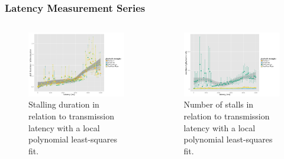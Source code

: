 \documentclass{beamer}
\begin{document}
\begin{frame}
	\frametitle{Latency Measurement Series}

	\begin{columns}[T]
		\begin{figure}
		\centering
		\includegraphics[width=1.0\columnwidth]{../../chapters/03-streaming/images/R-playbackemulation-stallduration-latency.pdf}
		\caption{Stalling duration in relation to transmission latency with a local polynomial least-squares fit.}
		\end{figure}

		\begin{figure}
		\centering
		\includegraphics[width=1.0\columnwidth]{../../chapters/03-streaming/images/R-playbackemulation-stallnumber-latency.pdf}
		\caption{Number of stalls in relation to transmission latency with a local polynomial least-squares fit.}
		\end{figure}
	\end{columns}
\end{frame}
\end{document}
